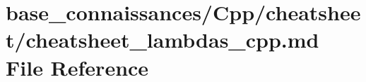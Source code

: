 \hypertarget{base__connaissances_2Cpp_2cheatsheet_2cheatsheet__lambdas__cpp_8md}{}\section{base\+\_\+connaissances/\+Cpp/cheatsheet/cheatsheet\+\_\+lambdas\+\_\+cpp.md File Reference}
\label{base__connaissances_2Cpp_2cheatsheet_2cheatsheet__lambdas__cpp_8md}
